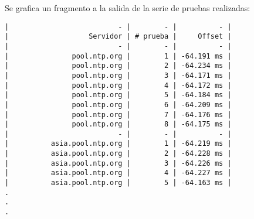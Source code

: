 Se grafica un fragmento a la salida de la serie de pruebas realizadas:

\begin{lstlisting}
|                          - |        - |          - |
|                   Servidor | # prueba |     Offset |
|                          - |        - |          - |
|               pool.ntp.org |        1 | -64.191 ms |
|               pool.ntp.org |        2 | -64.234 ms |
|               pool.ntp.org |        3 | -64.171 ms |
|               pool.ntp.org |        4 | -64.172 ms |
|               pool.ntp.org |        5 | -64.184 ms |
|               pool.ntp.org |        6 | -64.209 ms |
|               pool.ntp.org |        7 | -64.176 ms |
|               pool.ntp.org |        8 | -64.175 ms |
|                          - |        - |          - |
|          asia.pool.ntp.org |        1 | -64.219 ms |
|          asia.pool.ntp.org |        2 | -64.228 ms |
|          asia.pool.ntp.org |        3 | -64.226 ms |
|          asia.pool.ntp.org |        4 | -64.227 ms |
|          asia.pool.ntp.org |        5 | -64.163 ms |
.
.
.
\end{lstlisting}

\clearpage
\printbibliography




